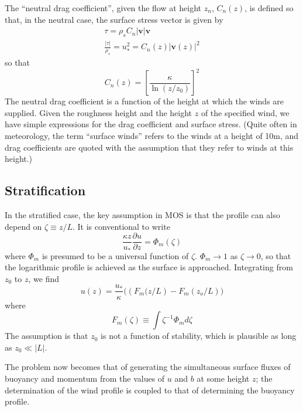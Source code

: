 \documentclass[12pt, letterpaper]{article}
\begin{document}
The ``neutral drag coefficient'', given the flow at height $z_n$,
$C_n(z)$, is defined so that, in the neutral case, the surface stress
vector is given by
\begin{gather}
  \tau = \rho_s C_n |\mathbf{v}| \mathbf{v} \\
  \frac{|\tau|}{\rho_s} = u_*^2 = C_n(z) |\mathbf{v}(z)|^2
\end{gather}
so that
\begin{equation}
  C_n(z) = \left[\frac{\kappa}{\ln\left(z/z_0\right)}\right]^2
\end{equation}
The neutral drag coefficient is a function of the height at which the
winds are supplied.  Given the roughness height and the height $z$ of
the specified wind, we have simple expressions for the drag
coefficient and surface stress.  (Quite often in meteorology, the term
``surface winds'' refers to the winds at a height of 10m, and drag
coefficients are quoted with the assumption that they refer to winds
at this height.)

\subsection{Stratification}

In the stratified case, the key assumption in MOS is that the profile
can also depend on $\zeta \equiv z/L$.  It is conventional to write
\begin{equation}
  \frac{\kappa z}{u_*}\frac{\partial u}{\partial z} = \Phi_m(\zeta)
\end{equation}
where $\Phi_m$ is presumed to be a universal function of $\zeta$.
$\Phi_m \rightarrow 1$ as $\zeta \rightarrow 0$, so that the
logarithmic profile is achieved as the surface is approached.
Integrating from $z_0$ to $z$, we find
\begin{equation}
  u(z) = \frac{u_*}{\kappa}\big(\left(F_m(z/L\right)-F_m\left(z_o/L\right)\big)
\end{equation}
where
\begin{equation}
  F_m(\zeta) \equiv \int \zeta^{-1}\Phi_m d\zeta
\end{equation}
The assumption is that $z_0$ is not a function of stability, which is
plausible as long as $z_0 \ll |L|$.

The problem now becomes that of generating the simultaneous surface
fluxes of buoyancy and momentum from the values of $u$ and $b$ at some
height $z$; the determination of the wind profile is coupled to that of
determining the buoyancy profile.
\end{document}
